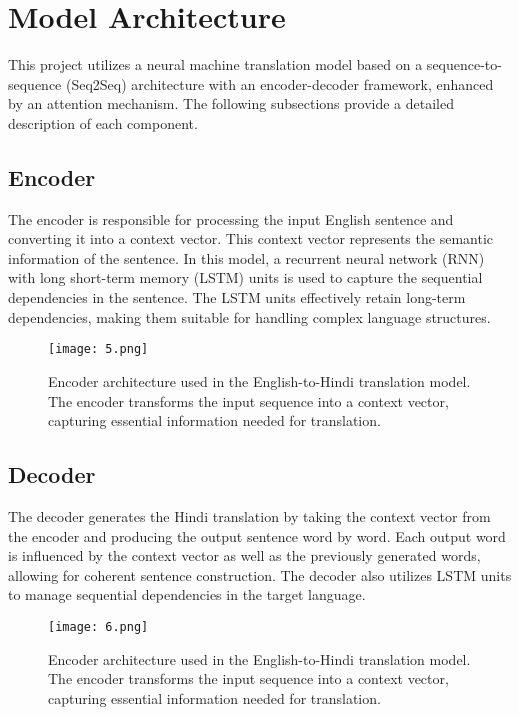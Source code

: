 \documentclass[12pt]{article}
\begin{document}
\section{Model Architecture}
This project utilizes a neural machine translation model based on a sequence-to-sequence (Seq2Seq) architecture with an encoder-decoder framework, enhanced by an attention mechanism. The following subsections provide a detailed description of each component.

\subsection{Encoder}
The encoder is responsible for processing the input English sentence and converting it into a context vector. This context vector represents the semantic information of the sentence. In this model, a recurrent neural network (RNN) with long short-term memory (LSTM) units is used to capture the sequential dependencies in the sentence. The LSTM units effectively retain long-term dependencies, making them suitable for handling complex language structures.

\begin{figure}[h!]
    \centering
    \texttt{[image: 5.png]} %
    \caption{Encoder architecture used in the English-to-Hindi translation model. The encoder transforms the input sequence into a context vector, capturing essential information needed for translation.}
    \label{fig:encoder_architecture}
\end{figure}

\subsection{Decoder}
The decoder generates the Hindi translation by taking the context vector from the encoder and producing the output sentence word by word. Each output word is influenced by the context vector as well as the previously generated words, allowing for coherent sentence construction. The decoder also utilizes LSTM units to manage sequential dependencies in the target language.

\begin{figure}[h!]
    \centering
    \texttt{[image: 6.png]} %
    \caption{Encoder architecture used in the English-to-Hindi translation model. The encoder transforms the input sequence into a context vector, capturing essential information needed for translation.}
    \label{fig:encoder_architecture}
\end{figure}
\end{document}
